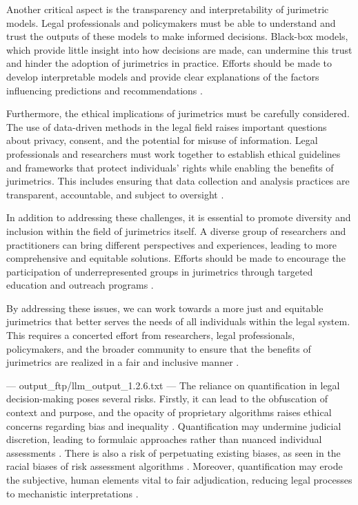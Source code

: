 Another critical aspect is the transparency and interpretability of jurimetric models. Legal professionals and policymakers must be able to understand and trust the outputs of these models to make informed decisions. Black-box models, which provide little insight into how decisions are made, can undermine this trust and hinder the adoption of jurimetrics in practice. Efforts should be made to develop interpretable models and provide clear explanations of the factors influencing predictions and recommendations \cite{rudin2019stop, doshi2017towards}.

Furthermore, the ethical implications of jurimetrics must be carefully considered. The use of data-driven methods in the legal field raises important questions about privacy, consent, and the potential for misuse of information. Legal professionals and researchers must work together to establish ethical guidelines and frameworks that protect individuals' rights while enabling the benefits of jurimetrics. This includes ensuring that data collection and analysis practices are transparent, accountable, and subject to oversight \cite{mittelstadt2016ethics, floridi2018ai}.

In addition to addressing these challenges, it is essential to promote diversity and inclusion within the field of jurimetrics itself. A diverse group of researchers and practitioners can bring different perspectives and experiences, leading to more comprehensive and equitable solutions. Efforts should be made to encourage the participation of underrepresented groups in jurimetrics through targeted education and outreach programs \cite{noble2018algorithms, benjamin2019race}.

By addressing these issues, we can work towards a more just and equitable jurimetrics that better serves the needs of all individuals within the legal system. This requires a concerted effort from researchers, legal professionals, policymakers, and the broader community to ensure that the benefits of jurimetrics are realized in a fair and inclusive manner \cite{eubanks2018automating, o2016weapons}.


---
output_ftp/llm_output_1.2.6.txt
---
The reliance on quantification in legal decision-making poses several risks. Firstly, it can lead to the obfuscation of context and purpose, and the opacity of proprietary algorithms raises ethical concerns regarding bias and inequality \cite{sareen2020, saltelli2020, ribeiro2021}. Quantification may undermine judicial discretion, leading to formulaic approaches rather than nuanced individual assessments \cite{nunes2018, lynch2019}. There is also a risk of perpetuating existing biases, as seen in the racial biases of risk assessment algorithms \cite{gillborn2017}. Moreover, quantification may erode the subjective, human elements vital to fair adjudication, reducing legal processes to mechanistic interpretations \cite{ribeiro2021, souza2019}.

